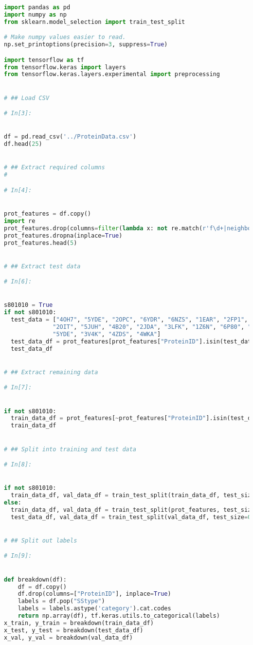 \documentclass[12pt,letterpaper,oneside,reqno]{book}
\theoremstyle{plain}
\theoremstyle{definition}
\theoremstyle{plain}
\theoremstyle{remark}
\theoremstyle{plain}
\theoremstyle{definition}
\theoremstyle{plain}
\begin{document}
\begin{appendices}
\begin{lstlisting}[language=Python, label=lst:3classdcnnfull, frame=single]
import pandas as pd
import numpy as np
from sklearn.model_selection import train_test_split

# Make numpy values easier to read.
np.set_printoptions(precision=3, suppress=True)

import tensorflow as tf
from tensorflow.keras import layers
from tensorflow.keras.layers.experimental import preprocessing


# ## Load CSV

# In[3]:


df = pd.read_csv('../ProteinData.csv')
df.head(25)


# ## Extract required columns
# 

# In[4]:


prot_features = df.copy()
import re
prot_features.drop(columns=filter(lambda x: not re.match(r'f\d+|neighbors|ProteinID|SStype', x) ,prot_features.columns), inplace=True)
prot_features.dropna(inplace=True)
prot_features.head(5)


# ## Extract test data

# In[6]:


s801010 = True
if not s801010:
  test_data = ["4OH7", "5YDE", "2OPC", "6YDR", "6NZS", "1EAR", "2FP1", "2Z6R",
              "2OIT", "5JUH", "4B20", "2JDA", "3LFK", "1Z6N", "6P80", "5UEB",
              "5YDE", "3V4K", "4ZDS", "4WKA"]
  test_data_df = prot_features[prot_features["ProteinID"].isin(test_data)]
  test_data_df


# ## Extract remaining data

# In[7]:


if not s801010:
  train_data_df = prot_features[~prot_features["ProteinID"].isin(test_data)]
  train_data_df


# ## Split into training and test data

# In[8]:


if not s801010:
  train_data_df, val_data_df = train_test_split(train_data_df, test_size=0.1)
else:
  train_data_df, val_data_df = train_test_split(prot_features, test_size=0.2)
  test_data_df, val_data_df = train_test_split(val_data_df, test_size=0.5)


# ## Split out labels

# In[9]:


def breakdown(df):
    df = df.copy()
    df.drop(columns=["ProteinID"], inplace=True)
    labels = df.pop("SStype")
    labels = labels.astype('category').cat.codes
    return np.array(df), tf.keras.utils.to_categorical(labels)
x_train, y_train = breakdown(train_data_df)
x_test, y_test = breakdown(test_data_df)
x_val, y_val = breakdown(val_data_df)



\end{lstlisting}
\end{appendices}
\end{document}
